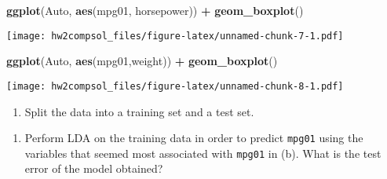 \documentclass[]{article}
\newenvironment{Shaded}{\begin{snugshade}}{\end{snugshade}}
\newcommand{\CommentTok}[1]{\textcolor[rgb]{0.56,0.35,0.01}{\textit{#1}}}
\newcommand{\DataTypeTok}[1]{\textcolor[rgb]{0.13,0.29,0.53}{#1}}
\newcommand{\DecValTok}[1]{\textcolor[rgb]{0.00,0.00,0.81}{#1}}
\newcommand{\FloatTok}[1]{\textcolor[rgb]{0.00,0.00,0.81}{#1}}
\newcommand{\KeywordTok}[1]{\textcolor[rgb]{0.13,0.29,0.53}{\textbf{#1}}}
\newcommand{\NormalTok}[1]{#1}
\newcommand{\OperatorTok}[1]{\textcolor[rgb]{0.81,0.36,0.00}{\textbf{#1}}}
\newcommand{\StringTok}[1]{\textcolor[rgb]{0.31,0.60,0.02}{#1}}
\providecommand{\tightlist}{%
  \setlength{\itemsep}{0pt}\setlength{\parskip}{0pt}}
\begin{document}
\begin{Shaded}
\begin{Highlighting}[]
\KeywordTok{ggplot}\NormalTok{(Auto, }\KeywordTok{aes}\NormalTok{(mpg01, horsepower)) }\OperatorTok{+}\StringTok{ }\KeywordTok{geom_boxplot}\NormalTok{()}
\end{Highlighting}
\end{Shaded}

\texttt{[image: hw2compsol\_files/figure-latex/unnamed-chunk-7-1.pdf]}
\newpage

\begin{Shaded}
\begin{Highlighting}[]
\KeywordTok{ggplot}\NormalTok{(Auto, }\KeywordTok{aes}\NormalTok{(mpg01,weight)) }\OperatorTok{+}\StringTok{ }\KeywordTok{geom_boxplot}\NormalTok{()}
\end{Highlighting}
\end{Shaded}

\texttt{[image: hw2compsol\_files/figure-latex/unnamed-chunk-8-1.pdf]}

\begin{enumerate}
\def\labelenumi{(\alph{enumi})}
\setcounter{enumi}{2}
\tightlist
\item
  Split the data into a training set and a test set.
\end{enumerate}

\begin{Shaded}
\end{Shaded}

\begin{enumerate}
\def\labelenumi{(\alph{enumi})}
\setcounter{enumi}{3}
\tightlist
\item
  Perform LDA on the training data in order to predict \texttt{mpg01}
  using the variables that seemed most associated with \texttt{mpg01} in
  (b). What is the test error of the model obtained?
\end{enumerate}
\end{document}
